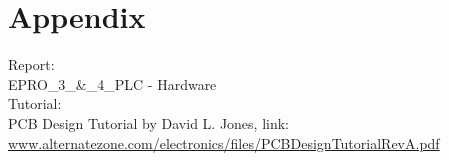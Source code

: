 \chapter{Appendix}
Report:\\
EPRO\_3\_\&\_4\_PLC - Hardware\\
Tutorial:\\
PCB Design Tutorial by David L. Jones, link:\\
\url{www.alternatezone.com/electronics/files/PCBDesignTutorialRevA.pdf}